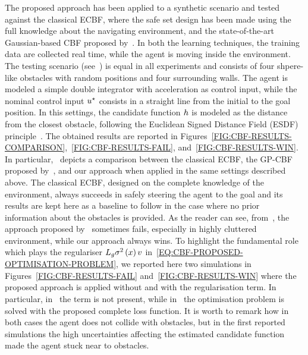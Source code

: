 The proposed approach has been applied to a synthetic scenario and tested against the classical ECBF, where the safe
set design has been made using the full knowledge about the navigating environment, and the state-of-the-art
Gaussian-based CBF proposed by~\cite{khan2022gaussian}. In both the learning techniques, the training data are collected
real time, while the agent is moving inside the environment.
The testing scenario (see~) is equal in all experiments and consists of four shpere-like
obstacles with random positions and four surrounding walls. The agent is modeled a simple double integrator with acceleration
as control input, while the nominal control input $u^{\star}$ consists in a straight line from the initial to the goal position.
In this settings, the candidate function $h$ is modeled as the distance from the closest obstacle, following the
Euclidean Signed Distance Field (ESDF) principle~\cite{oleynikova2017voxblox}.
The obtained results are reported in Figures~\ref{FIG:CBF-RESULTS-COMPARISON},~\ref{FIG:CBF-RESULTS-FAIL}, and~\ref{FIG:CBF-RESULTS-WIN}.
In particular,~ depicts a comparison between the classical ECBF, the GP-CBF proposed by~\cite{khan2022gaussian},
and our approach when applied in the same settings described above. The classical ECBF, designed on the complete knowledge of the
environment, always succeeds in safely steering the agent to the goal and its results are kept here as a baseline to follow in the case
where no prior information about the obstacles is provided. As the reader can see, from~,
the approach proposed by~\cite{khan2022gaussian} sometimes fails, especially in highly cluttered environment, while our approach
always wins. To highlight the fundamental role which plays the regulariser $L_{g} \sigma^2 \left( x \right) v$
in~\eqref{EQ:CBF-PROPOSED-OPTIMISATION-PROBLEM}, we reported here two simulations in Figures~\ref{FIG:CBF-RESULTS-FAIL} and~\ref{FIG:CBF-RESULTS-WIN}
where the proposed approach is applied without and with the regularisation term. In particular, in~
the term is not present, while in~ the optimisation problem is solved with the proposed complete loss function.
It is worth to remark how in both cases the agent does not collide with obstacles, but in the first reported simulations the high uncertainties
affecting the estimated candidate function made the agent stuck near to obstacles.

